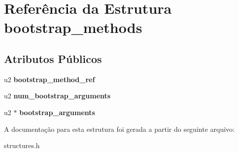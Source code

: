 \hypertarget{structbootstrap__methods}{}\section{Referência da Estrutura bootstrap\+\_\+methods}
\label{structbootstrap__methods}
\subsection*{Atributos Públicos}
\begin{DoxyCompactItemize}
\item 
\mbox{\label{structbootstrap__methods_a480411f5ca41d770aa9ce24ee7e8e1e8}} 
u2 {\bfseries bootstrap\+\_\+method\+\_\+ref}
\item 
\mbox{\label{structbootstrap__methods_aad28739e25a094400551fd1080fdb1f6}} 
u2 {\bfseries num\+\_\+bootstrap\+\_\+arguments}
\item 
\mbox{\label{structbootstrap__methods_a2204bb6639e44938bda3b11fbb32dd10}} 
u2 $\ast$ {\bfseries bootstrap\+\_\+arguments}
\end{DoxyCompactItemize}


A documentação para esta estrutura foi gerada a partir do seguinte arquivo\+:\begin{DoxyCompactItemize}
\item 
structures.\+h\end{DoxyCompactItemize}

